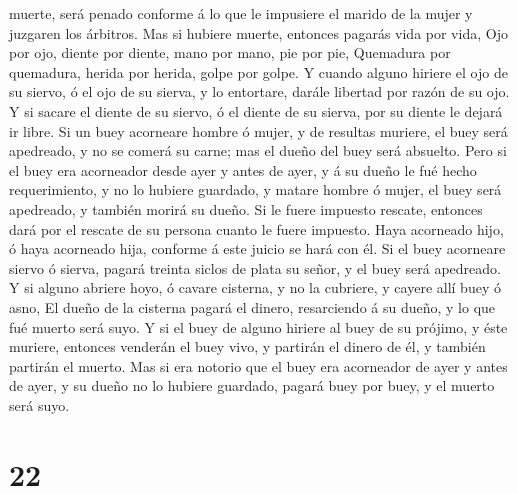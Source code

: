 muerte, será penado conforme á lo que le impusiere el marido de la mujer
y juzgaren los árbitros.  Mas si hubiere muerte, entonces
pagarás vida por vida,  Ojo por ojo, diente por diente,
mano por mano, pie por pie,  Quemadura por quemadura,
herida por herida, golpe por golpe.  Y cuando alguno
hiriere el ojo de su siervo, ó el ojo de su sierva, y lo entortare,
darále libertad por razón de su ojo.  Y si sacare el diente
de su siervo, ó el diente de su sierva, por su diente le dejará ir
libre.  Si un buey acorneare hombre ó mujer, y de resultas
muriere, el buey será apedreado, y no se comerá su carne; mas el dueño
del buey será absuelto.  Pero si el buey era acorneador
desde ayer y antes de ayer, y á su dueño le fué hecho requerimiento, y
no lo hubiere guardado, y matare hombre ó mujer, el buey será apedreado,
y también morirá su dueño.  Si le fuere impuesto rescate,
entonces dará por el rescate de su persona cuanto le fuere impuesto.
 Haya acorneado hijo, ó haya acorneado hija, conforme á
este juicio se hará con él.  Si el buey acorneare siervo ó
sierva, pagará treinta siclos de plata su señor, y el buey será
apedreado.  Y si alguno abriere hoyo, ó cavare cisterna, y
no la cubriere, y cayere allí buey ó asno,  El dueño de la
cisterna pagará el dinero, resarciendo á su dueño, y lo que fué muerto
será suyo.  Y si el buey de alguno hiriere al buey de su
prójimo, y éste muriere, entonces venderán el buey vivo, y partirán el
dinero de él, y también partirán el muerto.  Mas si era
notorio que el buey era acorneador de ayer y antes de ayer, y su dueño
no lo hubiere guardado, pagará buey por buey, y el muerto será suyo.

\hypertarget{section-21}{%
\section{22}\label{section-21}}

